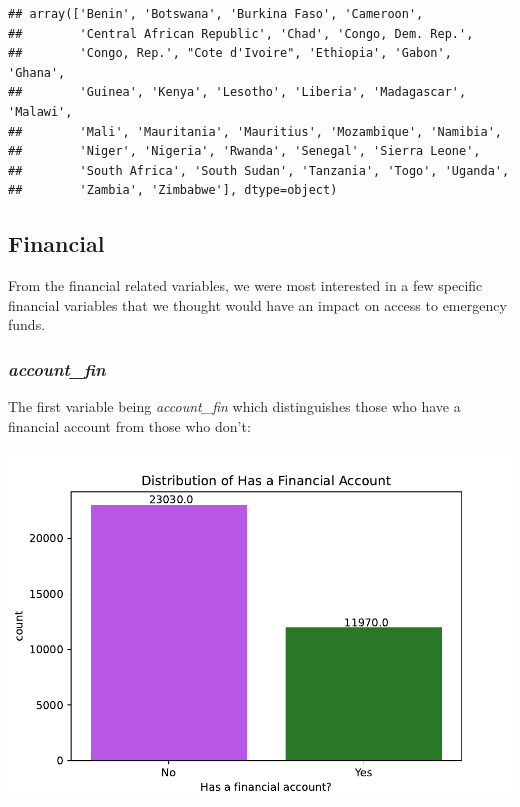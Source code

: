 \documentclass[water,article,submit,moreauthors,pdftex]{mdpi}
\begin{document}
\begin{verbatim}
## array(['Benin', 'Botswana', 'Burkina Faso', 'Cameroon',
##        'Central African Republic', 'Chad', 'Congo, Dem. Rep.',
##        'Congo, Rep.', "Cote d'Ivoire", 'Ethiopia', 'Gabon', 'Ghana',
##        'Guinea', 'Kenya', 'Lesotho', 'Liberia', 'Madagascar', 'Malawi',
##        'Mali', 'Mauritania', 'Mauritius', 'Mozambique', 'Namibia',
##        'Niger', 'Nigeria', 'Rwanda', 'Senegal', 'Sierra Leone',
##        'South Africa', 'South Sudan', 'Tanzania', 'Togo', 'Uganda',
##        'Zambia', 'Zimbabwe'], dtype=object)
\end{verbatim}

\hypertarget{financial}{%
\subsection{Financial}\label{financial}}

From the financial related variables, we were most interested in a few
specific financial variables that we thought would have an impact on
access to emergency funds.

\hypertarget{account_fin}{%
\subsubsection{\texorpdfstring{\emph{account\_fin}}{account\_fin}}\label{account_fin}}

The first variable being \emph{account\_fin} which distinguishes those
who have a financial account from those who don't:

\includegraphics{term_paper_files/figure-latex/unnamed-chunk-9-5.pdf}
\end{document}
